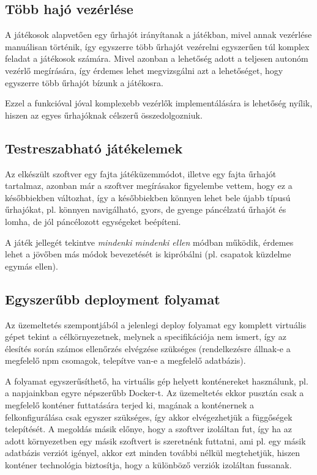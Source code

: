 \subsection{Több hajó vezérlése}

A játékosok alapvetően egy űrhajót irányítanak a játékban, mivel annak vezérlése
manuálisan történik, így egyszerre több űrhajót vezérelni egyszerűen túl komplex
feladat a játékosok számára. Mivel azonban a lehetőség adott a teljesen autonóm
vezérlő megírására, így érdemes lehet megvizsgálni azt a lehetőséget, hogy
egyszerre több űrhajót bízunk a játékosra.

Ezzel a funkcióval jóval komplexebb vezérlők implementálására is lehetőség
nyílik, hiszen az egyes űrhajóknak célszerű összedolgozniuk.

\subsection{Testreszabható játékelemek}

Az elkészült szoftver egy fajta játéküzemmódot, illetve egy fajta űrhajót
tartalmaz, azonban már a szoftver megírásakor figyelembe vettem, hogy ez a
későbbiekben változhat, így a későbbiekben könnyen lehet bele újabb típusú
űrhajókat, pl. könnyen navigálható, gyors, de gyenge páncélzatú űrhajót és
lomha, de jól páncélozott egységeket beépíteni.

A játék jellegét tekintve \emph{mindenki mindenki ellen} módban működik, érdemes
lehet a jövőben más módok bevezetését is kipróbálni (pl. csapatok küzdelme
egymás ellen).

\subsection{Egyszerűbb deployment folyamat}

Az üzemeltetés szempontjából a jelenlegi deploy folyamat egy komplett virtuális
gépet tekint a célkörnyezetnek, melynek a specifikációja nem ismert, így az
élesítés során számos ellenőrzés elvégzése szükséges (rendelkezésre állnak-e a
megfelelő npm csomagok, telepítve van-e a megfelelő adatbázis).

A folyamat egyszerűsíthető, ha virtuális gép helyett konténereket használunk,
pl. a napjainkban egyre népszerűbb Docker-t\cite{docker}. Az üzemeltetés ekkor
pusztán csak a megfelelő konténer futtatására terjed ki, magának a konténernek a
felkonfigurálása csak egyszer szükséges, így akkor elvégezhetjük a függőségek
telepítését. A megoldás másik előnye, hogy a szoftver izoláltan fut, így ha az
adott környezetben egy másik szoftvert is szeretnénk futtatni, ami pl. egy másik
adatbázis verziót igényel, akkor ezt minden további nélkül megtehetjük, hiszen
konténer technológia biztosítja, hogy a különböző verziók izoláltan fussanak.

